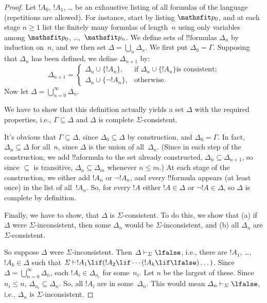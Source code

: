 \documentclass[../../../include/open-logic-section]{subfiles}
\begin{document}
\begin{proof}
Let $!A_0$, $!A_1$, \dots{} be an exhaustive listing of all formulas
of the language (repetitions are allowed). For instance, start by
listing $\Obj p_0$, and at each stage $n \ge 1$ list the finitely many
formulas of length~$n$ using only variables among $\Obj p_0$,
\dots,~$\Obj p_n$. We define sets of !!{formula}s $\Delta_n$ by
induction on~$n$, and we then set $\Delta = \bigcup_n \Delta_n$. We
first put $\Delta_0 = \Gamma$. Supposing that $\Delta_n$ has been
defined, we define $\Delta_{n+1}$ by:
\[
\Delta_{n+1} =
\begin{cases}
  \Delta_n \cup \{!A_n\}, & \text{if $\Delta_n \cup \{ !A_n\}$
    is consistent;} \\
  \Delta_n \cup \{ \lnot !A_n\}, & \text{otherwise.}
\end{cases}
\]
Now let $\Delta = \bigcup_{n=0}^\infty \Delta_n$.

We have to show that this definition actually yields a set $\Delta$
with the required properties, i.e., $\Gamma \subseteq \Delta$ and
$\Delta$ is complete $\Sigma$-consistent.

It's obvious that $\Gamma \subseteq \Delta$, since $\Delta_0 \subseteq
\Delta$ by construction, and $\Delta_0 = \Gamma$. In fact, $\Delta_n
\subseteq \Delta$ for all~$n$, since $\Delta$ is the union of
all~$\Delta_n$. (Since in each step of the construction, we add
!!a{formula} to the set already constructed, $\Delta_n \subseteq
\Delta_{n+1}$, so since $\subseteq$ is transitive, $\Delta_n \subseteq
\Delta_{m}$ whenever $n \le m$.)  At each stage of the construction, we
either add $!A_n$ or $\lnot !A_n$, and every !!{formula} appears (at
least once) in the list of all~$!A_n$. So, for every $!A$ either $!A
\in \Delta$ or $\lnot !A \in \Delta$, so $\Delta$ is complete by
definition.

Finally, we have to show, that $\Delta$ is $\Sigma$-consistent.  To do
this, we show that (a) if $\Delta$ were $\Sigma$-inconsistent, then
some $\Delta_n$ would be $\Sigma$-inconsistent, and (b) all $\Delta_n$
are $\Sigma$-consistent.
  
So suppose $\Delta$ were $\Sigma$-inconsistent. Then $\Delta
\Proves[\Sigma] \lfalse$, i.e., there are $!A_1$, \dots,~$!A_k \in
\Delta$ such that $\Sigma \Proves !A_1 \lif (!A_2 \lif \cdots (!A_k
\lif \lfalse)\dots)$. Since $\Delta = \bigcup_{n=0}^\infty \Delta_n$, each
$!A_i \in \Delta_{n_i}$ for some~$n_i$. Let $n$ be the largest of
these. Since $n_i \le n$, $\Delta_{n_i} \subseteq \Delta_n$. So, all
$!A_i$ are in some~$\Delta_n$. This would mean $\Delta_n
\Proves[\Sigma] \lfalse$, i.e., $\Delta_n$ is $\Sigma$-inconsistent.


\end{proof}
\end{document}
